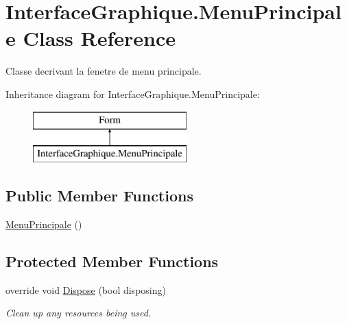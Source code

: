 \hypertarget{class_interface_graphique_1_1_menu_principale}{}\section{Interface\+Graphique.\+Menu\+Principale Class Reference}
\label{class_interface_graphique_1_1_menu_principale}


Classe decrivant la fenetre de menu principale.  


Inheritance diagram for Interface\+Graphique.\+Menu\+Principale\+:\begin{figure}[H]
\begin{center}
\leavevmode
\includegraphics[height=2.000000cm]{class_interface_graphique_1_1_menu_principale}
\end{center}
\end{figure}
\subsection*{Public Member Functions}
\begin{DoxyCompactItemize}
\item 
\hyperlink{group__inf2990_gaa576ec13d34d312b71a63a4c42091776}{Menu\+Principale} ()
\end{DoxyCompactItemize}
\subsection*{Protected Member Functions}
\begin{DoxyCompactItemize}
\item 
override void \hyperlink{class_interface_graphique_1_1_menu_principale_ad4c8e7dccf5eec2b510b759e641f6269}{Dispose} (bool disposing)
\begin{DoxyCompactList}\small\item\em Clean up any resources being used. \end{DoxyCompactList}\end{DoxyCompactItemize}

